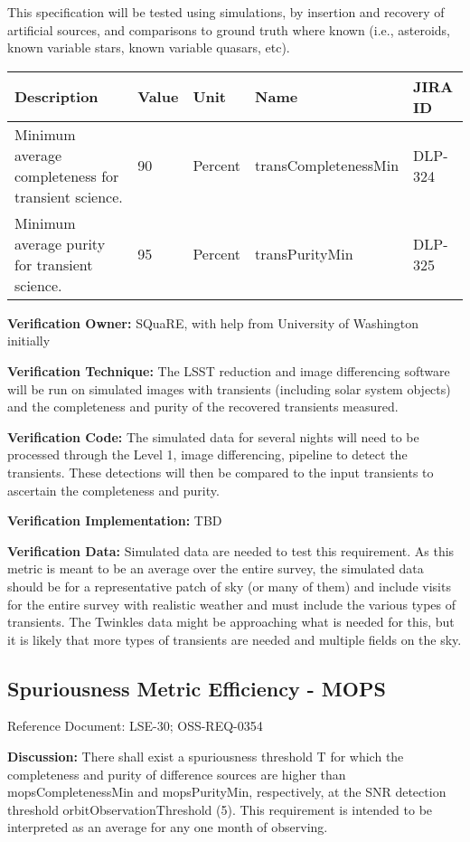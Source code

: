 \documentclass[DM,lsstdraft,toc]{lsstdoc}
\begin{document}
This specification will be tested using simulations, by insertion and
recovery of artificial sources, and comparisons to ground truth where
known (i.e., asteroids, known variable stars, known variable quasars,
etc).

\begin{longtable}[]{@{}p{}llll@{}}
\toprule
Description & Value & Unit & Name & JIRA ID\tabularnewline
\midrule
\endhead
Minimum average completeness for transient science. & 90 & Percent &
transCompletenessMin & DLP-324\tabularnewline
Minimum average purity for transient science. & 95 & Percent &
transPurityMin & DLP-325\tabularnewline
\bottomrule
\end{longtable}

\textbf{Verification Owner:} SQuaRE, with help from University of
Washington initially

\textbf{Verification Technique:} The LSST reduction and image
differencing software will be run on simulated images with transients
(including solar system objects) and the completeness and purity of the
recovered transients measured.

\textbf{Verification Code:} The simulated data for several nights will
need to be processed through the Level 1, image differencing, pipeline
to detect the transients. These detections will then be compared to the
input transients to ascertain the completeness and purity.

\textbf{Verification Implementation:} TBD

\textbf{Verification Data:} Simulated data are needed to test this
requirement. As this metric is meant to be an average over the entire
survey, the simulated data should be for a representative patch of sky
(or many of them) and include visits for the entire survey with
realistic weather and must include the various types of transients. The
Twinkles data might be approaching what is needed for this, but it is
likely that more types of transients are needed and multiple fields on
the sky.

\subsection{Spuriousness Metric Efficiency -
MOPS}\label{spuriousness-metric-efficiency---mops}

Reference Document: LSE-30; OSS-REQ-0354

\textbf{Discussion:} There shall exist a spuriousness threshold T for
which the completeness and purity of difference sources are higher than
mopsCompletenessMin and mopsPurityMin, respectively, at the SNR
detection threshold orbitObservationThreshold (5). This requirement is
intended to be interpreted as an average for any one month of observing.
\end{document}
